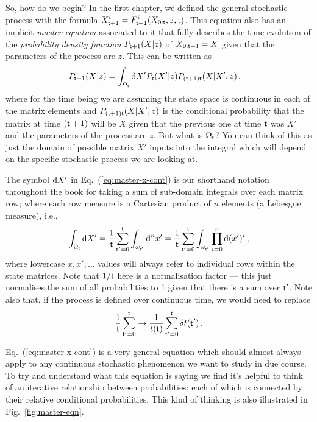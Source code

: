 So, how do we begin? In the first chapter, we defined the general stochastic process with the formula $X^{i}_{{\sf t}+1} = F^{i}_{{\sf t}+1}(X_{0:{\sf t}},z,{\sf t})$. This equation also has an implicit \emph{master equation} associated to it that fully describes the time evolution of the \emph{probability density function} $P_{{\sf t}+1}(X\vert z)$ of $X_{0:{\sf t}+1}=X$ given that the parameters of the process are $z$. This can be written as
\begin{align}
P_{{\sf t}+1}(X\vert z) &= \int_{\Omega_{{\sf t}}}{\rm d}X' P_{{\sf t}}(X'\vert z) P_{({\sf t}+1){\sf t}}(X\vert X',z) \label{eq:master-x-cont} \,,
\end{align}
where for the time being we are assuming the state space is continuous in each of the matrix elements and $P_{({\sf t}+1){\sf t}}(X\vert X',z)$ is the conditional probability that the matrix at time $({\sf t}+1)$ will be $X$ given that the previous one at time ${\sf t}$ was $X'$ and the parameters of the process are $z$. But what is $\Omega_{\sf t}$? You can think of this as just the domain of possible matrix $X'$ inputs into the integral which will depend on the specific stochastic process we are looking at. 

The symbol ${\rm d}X'$ in Eq.~(\ref{eq:master-x-cont}) is our shorthand notation throughout the book for taking a sum of sub-domain integrals over each matrix row; where each row measure is a Cartesian product of $n$ elements (a Lebesgue measure), i.e.,
\begin{align}
\int_{\Omega_{{\sf t}}}{\rm d}X' = \frac{1}{{\sf t}}\sum_{{\sf t}'=0}^{{\sf t}} \int_{\omega_{{\sf t}'}}{\rm d}^nx' = \frac{1}{{\sf t}}\sum_{{\sf t}'=0}^{{\sf t}} \int_{\omega_{{\sf t}'}}\prod_{i=0}^n{\rm d}(x')^i \,,
\end{align}
where lowercase $x, x', \dots$ values will always refer to individual rows within the state matrices. Note that $1/{\sf t}$ here is a normalisation factor --- this just normalises the sum of all probabilities to 1 given that there is a sum over ${\sf t}'$. Note also that, if the process is defined over continuous time, we would need to replace 
\begin{align}
\frac{1}{{\sf t}}\sum_{{\sf t}'=0}^{{\sf t}} \rightarrow \frac{1}{t({\sf t})}\sum_{{\sf t}'=0}^{{\sf t}}\delta t({\sf t}') \,.
\end{align}

Eq.~(\ref{eq:master-x-cont}) is a very general equation which should almost always apply to any continuous stochastic phenomenon we want to study in due course. To try and understand what this equation is saying we find it's helpful to think of an iterative relationship between probabilities; each of which is connected by their relative conditional probabilities. This kind of thinking is also illustrated in Fig.~\ref{fig:master-eqn}.

